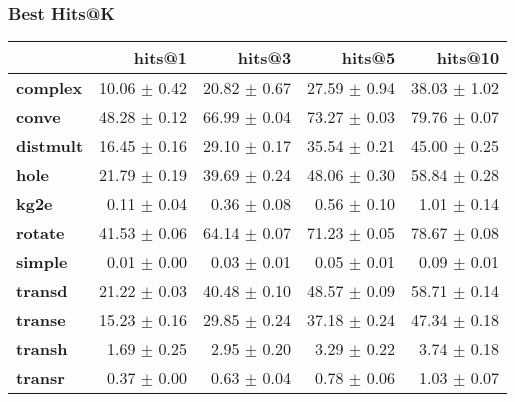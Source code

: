 \documentclass{article}
\begin{document}
    \subsubsection{Best Hits@K}
    \begin{center}
    \begin{tabular}{lrrrr}
\toprule
{} &        hits@1 &        hits@3 &        hits@5 &       hits@10 \\
\midrule
\textbf{complex } &  10.06 $\pm$ 0.42 &  20.82 $\pm$ 0.67 &  27.59 $\pm$ 0.94 &  38.03 $\pm$ 1.02 \\
\textbf{conve   } &  48.28 $\pm$ 0.12 &  66.99 $\pm$ 0.04 &  73.27 $\pm$ 0.03 &  79.76 $\pm$ 0.07 \\
\textbf{distmult} &  16.45 $\pm$ 0.16 &  29.10 $\pm$ 0.17 &  35.54 $\pm$ 0.21 &  45.00 $\pm$ 0.25 \\
\textbf{hole    } &  21.79 $\pm$ 0.19 &  39.69 $\pm$ 0.24 &  48.06 $\pm$ 0.30 &  58.84 $\pm$ 0.28 \\
\textbf{kg2e    } &   0.11 $\pm$ 0.04 &   0.36 $\pm$ 0.08 &   0.56 $\pm$ 0.10 &   1.01 $\pm$ 0.14 \\
\textbf{rotate  } &  41.53 $\pm$ 0.06 &  64.14 $\pm$ 0.07 &  71.23 $\pm$ 0.05 &  78.67 $\pm$ 0.08 \\
\textbf{simple  } &   0.01 $\pm$ 0.00 &   0.03 $\pm$ 0.01 &   0.05 $\pm$ 0.01 &   0.09 $\pm$ 0.01 \\
\textbf{transd  } &  21.22 $\pm$ 0.03 &  40.48 $\pm$ 0.10 &  48.57 $\pm$ 0.09 &  58.71 $\pm$ 0.14 \\
\textbf{transe  } &  15.23 $\pm$ 0.16 &  29.85 $\pm$ 0.24 &  37.18 $\pm$ 0.24 &  47.34 $\pm$ 0.18 \\
\textbf{transh  } &   1.69 $\pm$ 0.25 &   2.95 $\pm$ 0.20 &   3.29 $\pm$ 0.22 &   3.74 $\pm$ 0.18 \\
\textbf{transr  } &   0.37 $\pm$ 0.00 &   0.63 $\pm$ 0.04 &   0.78 $\pm$ 0.06 &   1.03 $\pm$ 0.07 \\
\bottomrule
\end{tabular}

    \end{center}
\end{document}
